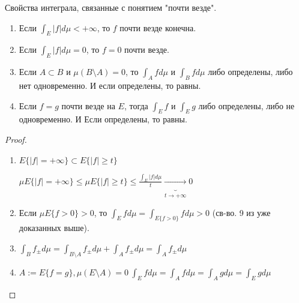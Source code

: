 \begin{properties}
    Свойства интеграла, связанные с понятием "почти везде".

    \begin{enumerate}
        \item Если $\int_{E}{|f| d \mu} < + \infty$, то $f$ почти везде конечна.
        \item Если $\int_E{|f| d \mu = 0}$, то $f = 0$ почти везде.
        \item Если $A \subset B$ и $\mu (B \setminus A) = 0$, то $\int_A{f d \mu}$ и $\int_B{f d \mu}$ либо определены, либо нет одновременно. И если определены, то равны.
        \item Если $f = g$ почти везде на $E$, тогда $\int_E{f}$ и $\int_E{g}$ либо определены, либо не одновременно. И Если определены, то равны.
    \end{enumerate}
\end{properties}

\begin{proof}
    \begin{enumerate}
        \item {
            $E\{ |f| = +\infty \} \subset E\{ |f| \geq t \}$

            $\mu E \{ |f| = +\infty \} \leq \mu E \{ |f| \geq t \} \leq \frac{\int_E{|f| d \mu}}{t} \underbrace{\rightarrow}_{t \rightarrow +\infty} 0$
        }
        \item {
            Если $\mu E \{ f > 0 \} > 0$, то $\int_E{f d \mu} = \int_{E\{ f > 0 \}}{f d \mu} > 0$ (св-во. 9 из уже доказанных выше).
        }
        \item {
            $\int_B{f_{\pm} d \mu} = \int_{B \setminus A}{f_{\pm} d \mu} + \int_{A}{f_{\pm} d \mu} = \int_A{f_{\pm} d \mu}$
        }
        \item {
            $A := E\{ f = g \}, \mu (E \setminus A) = 0 \ \int_{E}{f d \mu} = \int_{A}{f d \mu} = \int_{A}{g d \mu} = \int_E{g d \mu}$
        }
    \end{enumerate}
\end{proof}


